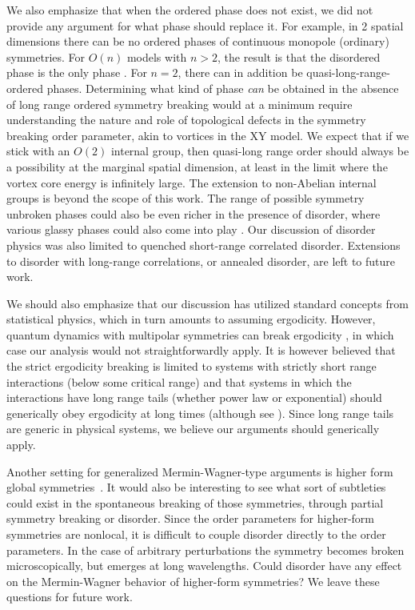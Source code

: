 \documentclass[pra,aps,twocolumn, amsfonts,amsmath,amssymb,nofootinbib,superscriptaddress]{revtex4-2}
\begin{document}
We also emphasize that when the ordered phase does not exist, we did not provide any argument for what phase should replace it. For example, in 2 spatial dimensions there can be no ordered phases of continuous monopole (ordinary) symmetries. For $O(n)$ models with $n>2$, the result is that the disordered phase is the only phase \cite{polyakov}. For $n=2$, there can in addition be quasi-long-range-ordered phases. Determining what kind of phase {\it can} be obtained in the absence of long range ordered symmetry breaking would at a minimum require understanding the nature and role of topological defects in the symmetry breaking order parameter, akin to vortices in the XY model. We expect that if we stick with an $O(2)$ internal group, then quasi-long range order should always be a possibility at the marginal spatial dimension, at least in the limit where the vortex core energy is infinitely large. The extension to non-Abelian internal groups is beyond the scope of this work. 
The range of possible symmetry unbroken phases could also be even richer in the presence of disorder, where various glassy phases could also come into play \cite{Fisheretal}. Our discussion of disorder physics was also limited to quenched short-range correlated disorder. Extensions to disorder with long-range correlations, or annealed disorder, are left to future work.

We should also emphasize that our discussion has utilized standard concepts from statistical physics, which in turn amounts to assuming ergodicity. However, quantum dynamics with multipolar symmetries can break ergodicity \cite{KHN, Sala}, in which case our analysis would not straightforwardly apply. It is however believed that the strict ergodicity breaking is limited to systems with strictly short range interactions (below some critical range) and that systems in which the interactions have long range tails (whether power law or exponential) should generically obey ergodicity at long times (although see \cite{NS}). Since long range tails are generic in physical systems, we believe our arguments should generically apply.  

Another setting for generalized Mermin-Wagner-type arguments is higher form global symmetries~\cite{GKSW, Lake, Marvin}. It would also be interesting to see what sort of subtleties could exist in the spontaneous breaking of those symmetries, through partial symmetry breaking or disorder. Since the order parameters for higher-form symmetries are nonlocal, it is difficult to couple disorder directly to the order parameters. In the case of arbitrary perturbations the symmetry becomes broken microscopically, but emerges at long wavelengths. Could disorder have any effect on the Mermin-Wagner behavior of higher-form symmetries? We leave these questions for future work. 
\end{document}
